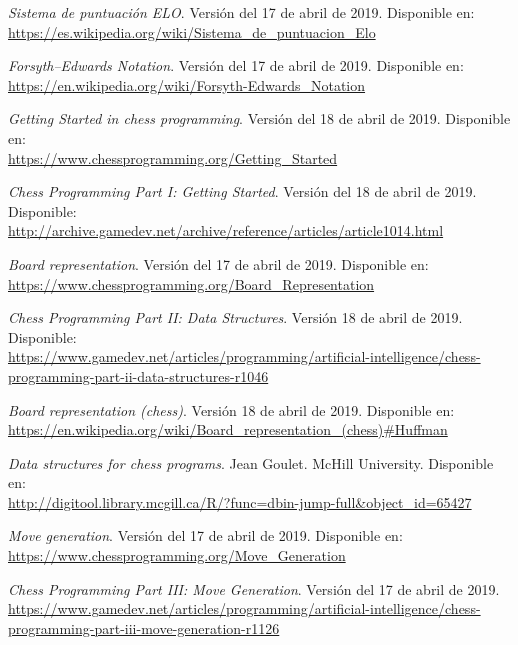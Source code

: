 \documentclass[letterpaper,12pt]{article}
\begin{document}
\begin{thebibliography}{99}
\textit{Sistema de puntuación ELO}. Versión del 17 de abril de 2019. Disponible en: \\
\url{https://es.wikipedia.org/wiki/Sistema_de_puntuacion_Elo}

\textit{Forsyth–Edwards Notation}. Versión del 17 de abril de 2019. Disponible en: \\
\url{https://en.wikipedia.org/wiki/Forsyth-Edwards_Notation}

\textit{Getting Started in chess programming}. Versión del 18 de abril de 2019. 
Disponible en: \\
\url{https://www.chessprogramming.org/Getting_Started}

\textit{Chess Programming Part I: Getting Started}. Versión del 18 de abril de 2019. 
Disponible: \\
\url{http://archive.gamedev.net/archive/reference/articles/article1014.html}

\textit{Board representation}. Versión del 17 de abril de 2019. Disponible en: \\
\url{https://www.chessprogramming.org/Board_Representation}

\textit{Chess Programming Part II: Data Structures}. Versión 18 de abril de 2019. 
Disponible: \\
\url{https://www.gamedev.net/articles/programming/artificial-intelligence/chess-programming-part-ii-data-structures-r1046}

\textit{Board representation (chess)}. Versión 18 de abril de 2019. Disponible en: \\
\url{https://en.wikipedia.org/wiki/Board_representation_(chess)#Huffman}

\textit{Data structures for chess programs}. Jean Goulet. McHill University. Disponible 
en: \\ \url{http://digitool.library.mcgill.ca/R/?func=dbin-jump-full&object_id=65427}

\textit{Move generation}. Versión del 17 de abril de 2019. Disponible en: \\
\url{https://www.chessprogramming.org/Move_Generation}

\textit{Chess Programming Part III: Move Generation}. Versión del 17 de abril de 2019.
\\ \url{https://www.gamedev.net/articles/programming/artificial-intelligence/chess-programming-part-iii-move-generation-r1126}


\end{thebibliography}
\end{document}
